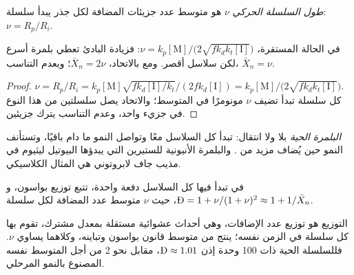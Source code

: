 \begin{definition}\label{def:b2:polymer-synthesis:chain-length}
\emph{طول السلسلة الحركي} $\nu$ هو متوسط عدد جزيئات 
المضافة لكل جذر يبدأ سلسلة: $\nu = R_p/R_i$.
\end{definition}

\begin{proposition}\label{prop:b2:polymer-synthesis:chain-length}
في الحالة المستقرة، $\nu = k_p[\mathrm M]/\bigl(2\sqrt{fk_dk_t[\mathrm I]}\bigr)$: فزيادة البادئ تعطي
بلمرة أسرع لكن سلاسل أقصر. ومع  بالاتحاد، $\bar X_n = 2\nu$؛ وبعدم
التناسب، $\bar X_n = \nu$.
\end{proposition}

\begin{proof}
$\nu = R_p/R_i = k_p[\mathrm M]\sqrt{fk_d[\mathrm I]/k_t}/(2fk_d[\mathrm I]) =
k_p[\mathrm M]/\bigl(2\sqrt{fk_dk_t[\mathrm I]}\bigr)$. كل سلسلة تبدأ تضيف $\nu$ مونومرًا في المتوسط؛
والاتحاد يصل سلسلتين من هذا النوع في جزيء واحد، وعدم التناسب يترك جزيئين.
\end{proof}

\begin{definition}\label{def:b2:polymer-synthesis:living}
\emph{البلمرة الحية}  بلا
 ولا انتقال: تبدأ كل السلاسل معًا وتواصل النمو ما دام  باقيًا، 
وتستأنف النمو حين يُضاف مزيد من . والبلمرة الأنيونية للستيرين التي يبدؤها
البيوتيل ليثيوم في مذيب جاف لابروتوني هي المثال الكلاسيكي.
\end{definition}

\begin{proposition}\label{prop:b2:polymer-synthesis:living}
في  تبدأ فيها كل السلاسل دفعة واحدة، تتبع 
توزيع بواسون، و$\text{\DH} = 1 + \nu/(1+\nu)^2 \approx 1 + 1/\bar X_n$، حيث $\nu$
متوسط عدد  المضافة لكل سلسلة.
\end{proposition}

\admitted

التوزيع هو توزيع عدد الإضافات، وهي أحداث عشوائية مستقلة بمعدل مشترك، تقوم بها
كل سلسلة في الزمن نفسه؛  ينتج من متوسط قانون بواسون وتباينه،
وكلاهما يساوي $\nu$. فللسلسلة الحية ذات 100 وحدة إذن $\text{\DH} \approx 1.01$، مقابل نحو 2 من أجل
المتوسط نفسه المصنوع بالنمو المرحلي.


